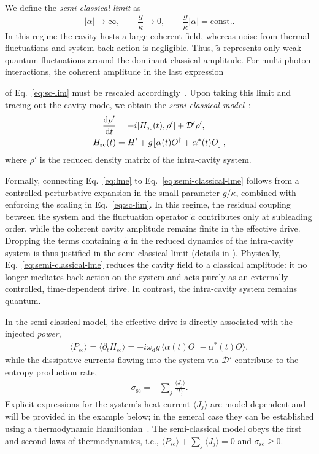 \documentclass[aps,twocolumn,10pt,prl,floatfix,nofootinbib, superscriptaddress]{revtex4-2}
\begin{document}
We define the \textit{semi-classical limit} as
\begin{equation}
|\alpha| \to \infty,
\qquad
\frac{g}{\kappa} \to 0,
\qquad
\frac{g}{\kappa}|\alpha| = \text{const.}.
\label{eq:sc-lim}
\end{equation}
In this regime the cavity hosts a large coherent field, whereas noise from thermal fluctuations and system back-action is negligible.
Thus, $\tilde{a}$ represents only weak quantum fluctuations around the dominant classical amplitude. For multi-photon interactions, the coherent amplitude in the last expression

of Eq.~\eqref{eq:sc-lim} must be rescaled accordingly~\cite{supmat}.
Upon taking this limit and tracing out the cavity mode, we obtain the \textit{semi-classical model}~\cite{supmat}:
\begin{align}
\dv{\rho'}{t}
&= -i[H_\text{sc}(t),\rho'] + \mathcal{D}'\rho', \label{eq:semi-classical-lme} \\
H_\text{sc}(t) &= H' + g\!\left[\alpha(t)O^\dagger + \alpha^*(t)O\right], \nonumber
\end{align}
where $\rho'$ is the reduced density matrix of the intra-cavity system.



Formally, connecting Eq.~\eqref{eq:lme} to Eq.~\eqref{eq:semi-classical-lme} follows from a controlled perturbative expansion in the small parameter $g/\kappa$, combined with enforcing the scaling in Eq.~\eqref{eq:sc-lim}. In this regime, the residual coupling between the system and the fluctuation operator $\tilde{a}$ contributes only at subleading order, while the coherent cavity amplitude remains finite in the effective drive. Dropping the terms containing $\tilde{a}$ in the reduced dynamics of the intra-cavity system is thus justified in the semi-classical limit (details in \cite{supmat}).
Physically,  Eq.~\eqref{eq:semi-classical-lme} reduces the cavity field to a classical amplitude: it no longer mediates back-action on the system and acts purely as an externally controlled, time-dependent drive. In contrast, the intra-cavity system remains quantum.



In the semi-classical model, the effective drive is directly associated with the injected \textit{power},
\begin{align}
    \langle P_\text{sc} \rangle = \langle \partial_t H_\text{sc} \rangle= -i \omega_\text{d} g  \,\langle\alpha(t) O^\dagger - \alpha^*(t)O\rangle,
\end{align}
while the dissipative currents flowing into the system via $\mathcal{D}'$ contribute to the entropy production rate,
\begin{align}
    \sigma_\text{sc} = -\sum_{j} \frac{\langle J_j \rangle}{T_j}.\label{eq:sigma-sc}
\end{align}
Explicit expressions for the system's heat current $\langle J_j \rangle$ are model-dependent and will be provided in the example below; in the general case they can be established using a thermodynamic Hamiltonian~\cite{supmat, schrauwen2025, Potts_2021}. The semi-classical model obeys the first and second laws of thermodynamics, i.e., $\langle P_\text{sc}\rangle +\sum_j\langle J_j\rangle = 0$ and $\sigma_\text{sc}\geq 0$.
\end{document}
